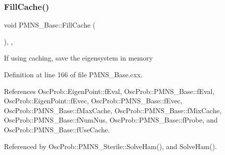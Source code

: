 \subsubsection{\texorpdfstring{Fill\+Cache()}{FillCache()}}
{\footnotesize\ttfamily void P\+M\+N\+S\+\_\+\+Base\+::\+Fill\+Cache (\begin{DoxyParamCaption}{ }\end{DoxyParamCaption})\hspace{0.3cm}{\ttfamily [protected]}, {\ttfamily [virtual]}, {\ttfamily [inherited]}}

If using caching, save the eigensystem in memory 

Definition at line 166 of file P\+M\+N\+S\+\_\+\+Base.\+cxx.



References Osc\+Prob\+::\+Eigen\+Point\+::f\+Eval, Osc\+Prob\+::\+P\+M\+N\+S\+\_\+\+Base\+::f\+Eval, Osc\+Prob\+::\+Eigen\+Point\+::f\+Evec, Osc\+Prob\+::\+P\+M\+N\+S\+\_\+\+Base\+::f\+Evec, Osc\+Prob\+::\+P\+M\+N\+S\+\_\+\+Base\+::f\+Max\+Cache, Osc\+Prob\+::\+P\+M\+N\+S\+\_\+\+Base\+::f\+Mix\+Cache, Osc\+Prob\+::\+P\+M\+N\+S\+\_\+\+Base\+::f\+Num\+Nus, Osc\+Prob\+::\+P\+M\+N\+S\+\_\+\+Base\+::f\+Probe, and Osc\+Prob\+::\+P\+M\+N\+S\+\_\+\+Base\+::f\+Use\+Cache.



Referenced by Osc\+Prob\+::\+P\+M\+N\+S\+\_\+\+Sterile\+::\+Solve\+Ham(), and Solve\+Ham().


